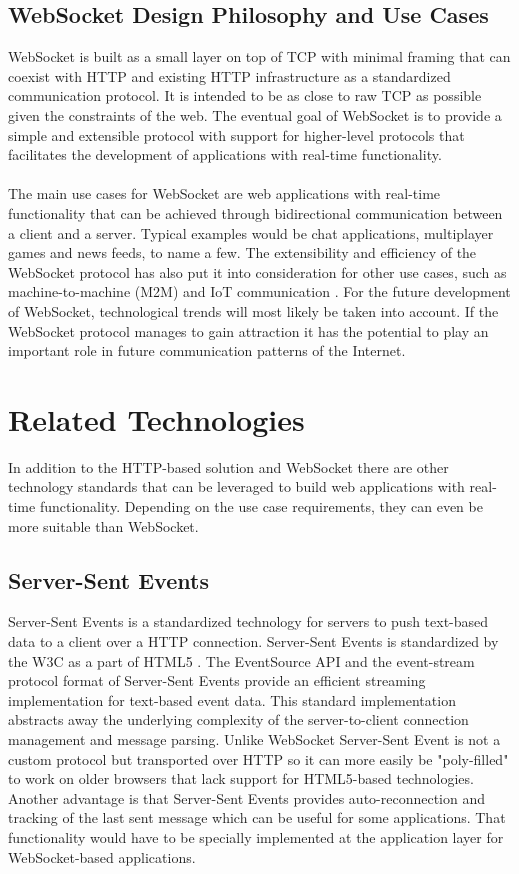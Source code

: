 \subsection{WebSocket Design Philosophy and Use Cases}

WebSocket is built as a small layer on top of TCP with minimal framing that can coexist with HTTP and existing HTTP infrastructure as a standardized communication protocol. It is intended to be as close to raw TCP as possible given the constraints of the web. The eventual goal of WebSocket is to provide a simple and extensible protocol with support for higher-level protocols that facilitates the development of applications with real-time functionality.
\\ \\
The main use cases for WebSocket are web applications with real-time functionality that can be achieved through bidirectional communication between a client and a server. Typical examples would be chat applications, multiplayer games and news feeds, to name a few. The extensibility and efficiency of the WebSocket protocol has also put it into consideration for other use cases, such as machine-to-machine (M2M) and IoT communication \cite{perez2013electric,doukas2015providing}. For the future development of WebSocket, technological trends will most likely be taken into account. If the WebSocket protocol manages to gain attraction it has the potential to play an important role in future communication patterns of the Internet.

\section{Related Technologies}

In addition to the HTTP-based solution and WebSocket there are other technology standards that can be leveraged to build web applications with real-time functionality. Depending on the use case requirements, they can even be more suitable than WebSocket.

\subsection{Server-Sent Events}

Server-Sent Events is a standardized technology for servers to push text-based data to a client over a HTTP connection. Server-Sent Events is standardized by the W3C as a part of HTML5 \cite{hickson2009server}. The EventSource API and the event-stream protocol format of Server-Sent Events provide an efficient streaming implementation for text-based event data. This standard implementation abstracts away the underlying complexity of the server-to-client connection management and message parsing. Unlike WebSocket Server-Sent Event is not a custom protocol but transported over HTTP so it can more easily be "poly-filled" to work on older browsers that lack support for HTML5-based technologies. Another advantage is that Server-Sent Events provides auto-reconnection and tracking of the last sent message which can be useful for some applications. That functionality would have to be specially implemented at the application layer for WebSocket-based applications.

